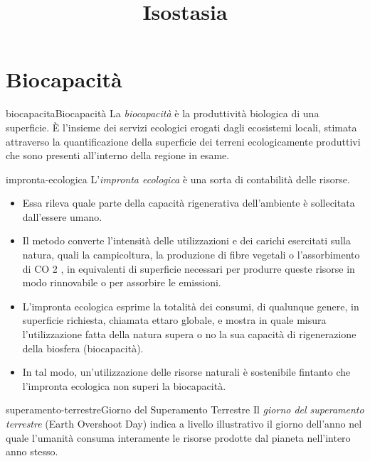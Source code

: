 \documentclass[preview]{standalone}
\begin{document}
\title{Isostasia}
\genpage

\section{Biocapacità}

\begin{snippetdefinition}{biocapacita}{Biocapacità}
    La \textit{biocapacità} è la produttività biologica di una superficie. È
    l'insieme dei servizi ecologici erogati dagli ecosistemi locali, stimata
    attraverso la quantificazione della superficie dei terreni
    ecologicamente produttivi che sono presenti all'interno della regione
    in esame.
\end{snippetdefinition}


\begin{snippet}{impronta-ecologica}
    L'\textit{impronta ecologica} è una sorta di contabilità delle risorse.
    \begin{itemize}
        \item Essa rileva quale parte della capacità rigenerativa
            dell'ambiente è sollecitata dall'essere umano.
        \item Il metodo converte l'intensità delle utilizzazioni e dei
            carichi esercitati sulla natura, quali la campicoltura, la
            produzione di fibre vegetali o l'assorbimento di CO 2 , in
            equivalenti di superficie necessari per produrre queste
            risorse in modo rinnovabile o per assorbire le emissioni.
        \item L'impronta ecologica esprime la totalità dei consumi, di qualunque
            genere, in superficie richiesta, chiamata ettaro globale, e mostra
            in quale misura l'utilizzazione fatta della natura supera o no la sua
            capacità di rigenerazione della biosfera (biocapacità). 
        \item In tal modo, un'utilizzazione delle risorse naturali è sostenibile
            fintanto che l'impronta ecologica non superi la biocapacità.
    \end{itemize}
\end{snippet}

\begin{snippetdefinition}{superamento-terrestre}{Giorno del Superamento Terrestre}
    Il \textit{giorno del superamento terrestre} (Earth Overshoot Day)
    indica a livello illustrativo il giorno dell'anno nel quale l'umanità
    consuma interamente le risorse prodotte dal pianeta nell'intero anno stesso. 
\end{snippetdefinition}

\end{document}
